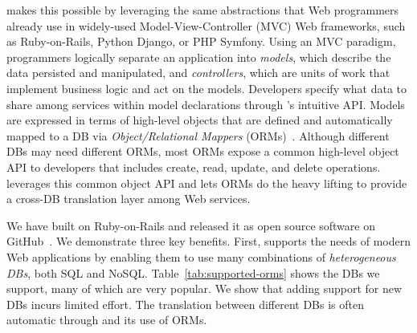 \synapse makes this possible by leveraging the same abstractions that Web
programmers already use in widely-used Model-View-Controller (MVC) Web
frameworks, such as Ruby-on-Rails, Python Django, or PHP Symfony.  Using an MVC
paradigm, programmers logically separate an application into \emph{models},
which describe the data persisted and manipulated, and \emph{controllers}, which
are units of work that implement business logic and act on the models.
Developers specify what data to share among services within model declarations
through \synapse's intuitive API.  Models are expressed in terms of high-level
objects that are defined and automatically mapped to a DB via {\em
Object/Relational Mappers} (ORMs)~\cite{Barcia:2008aa}.  Although different DBs
may need different ORMs, most ORMs expose a common high-level object API to
developers that includes create, read, update, and delete operations.  \synapse
leverages this common object API and lets ORMs do the heavy lifting to provide a
cross-DB translation layer among Web services.

\begin{table}[t]
\caption{DB types and vendors supported by \synapse.}
\label{tab:supported-orms}
\end{table}

We have built \synapse on Ruby-on-Rails and released it as open source software
 on GitHub~\cite{synapse-sources}. We demonstrate three
key benefits.  First, \synapse supports the needs of modern Web
applications by enabling them to use many combinations of
\emph{heterogeneous DBs}, both SQL and NoSQL. Table~\ref{tab:supported-orms}
shows the DBs we support, many of which are very popular.
We show that adding support for new DBs incurs limited effort.  The translation
between different DBs is often automatic through \synapse and its use of ORMs.

